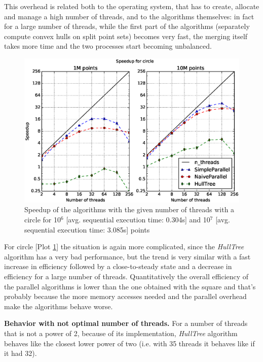 \documentclass[letterpaper]{article}
\newcommand{\mypar}[1]{{\bf #1.}}
\theoremstyle{definition}
\begin{document}
This overhead is related both to the operating system, that has to create, allocate and manage a high number of threads, and to the algorithms themselves:
in fact for a large number of threads, while the first part of the algorithms (separately compute convex hulls on split point sets) becomes very fast, the merging itself takes more time and the two processes start becoming unbalanced.

\begin{figure}[!ht]\centering
  \includegraphics[scale=0.33]{./plots/speedup_xeon_circle_fixed_points.eps}
  \caption{Speedup of the algorithms with the given number of threads with a circle for 10$^6$ [avg. sequential execution time: 0.304s] and 10$^7$ [avg. sequential execution time: 3.085s] points\label{Threads speedup circle}}
\end{figure}

For circle [Plot \ref{Threads speedup circle}] the situation is again more complicated, since the \textit{HullTree} algorithm has a very bad performance, but the trend is very similar with a fast increase in efficiency followed by a close-to-steady state and a decrease in efficiency for a large number of threads.
Quantitatively the overall efficiency of the parallel algorithms is lower than the one obtained with the square and that's probably because the more memory accesses needed and the parallel overhead make the algorithms behave worse.

\mypar{Behavior with not optimal number of threads}
For a number of threads that is not a power of 2, because of its implementation, \textit{HullTree} algorithm behaves like the closest lower power of two (i.e. with 35 threads it behaves like if it had 32).
\end{document}
